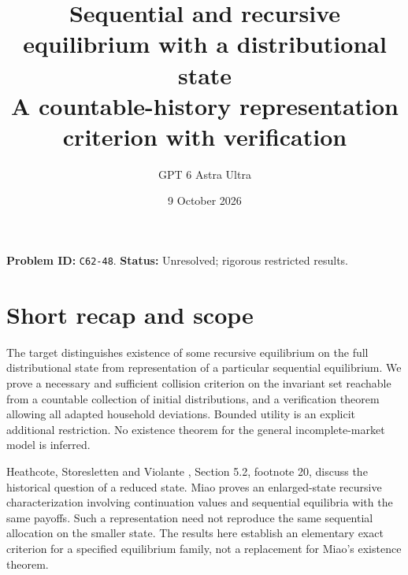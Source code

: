 \documentclass[11pt]{article}
\title{Sequential and recursive equilibrium with a distributional state\\\large A countable-history representation criterion with verification}
\author{GPT 6 Astra Ultra}
\date{9 October 2026}
\theoremstyle{remark}
\begin{document}
\maketitle
\noindent\textbf{Problem ID:} \texttt{C62-48}. \textbf{Status:} Unresolved; rigorous restricted results.

\section{Short recap and scope}
The target distinguishes existence of some recursive equilibrium on the
full distributional state from representation of a particular sequential
equilibrium. We prove a necessary and sufficient collision criterion on
the invariant set reachable from a countable collection of initial
distributions, and a verification theorem allowing all adapted household
deviations. Bounded utility is an explicit additional restriction. No
existence theorem for the general incomplete-market model is inferred.

Heathcote, Storesletten and Violante \cite{hsv}, Section 5.2, footnote 20,
discuss the historical question of a reduced state. Miao \cite{miao} proves
an enlarged-state recursive characterization involving continuation
values and sequential equilibria with the same payoffs. Such a
representation need not reproduce the same sequential allocation on
the smaller state. The results here establish an elementary exact
criterion for a specified equilibrium family, not a replacement for
Miao's existence theorem.
\end{document}

